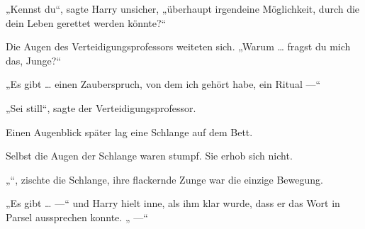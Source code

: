 
„Kennst du“, sagte Harry unsicher, „überhaupt irgendeine Möglichkeit, durch die dein Leben gerettet werden könnte?“

Die Augen des Verteidigungsprofessors weiteten sich.
„Warum … fragst du mich das, Junge?“

„Es gibt … einen Zauberspruch, von dem ich gehört habe, ein Ritual —“

„Sei still“, sagte der Verteidigungsprofessor.

Einen Augenblick später lag eine Schlange auf dem Bett.

Selbst die Augen der Schlange waren stumpf. Sie erhob sich nicht.

„“, zischte die Schlange, ihre flackernde Zunge war die einzige Bewegung.

„Es gibt …  —“ und Harry hielt inne, als ihm klar wurde, dass er das Wort in Parsel aussprechen konnte.
„ —“

